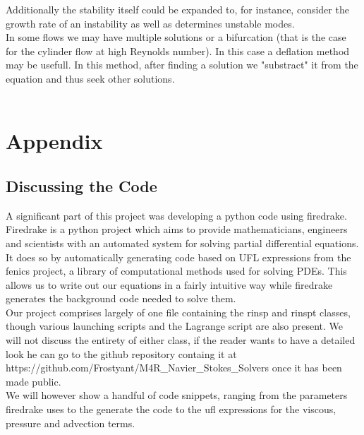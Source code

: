 \documentclass[11pt,twoside,a4paper]{article}
\begin{document}
Additionally the stability itself could be expanded to, for instance, consider the growth rate of an instability as well as determines unstable modes.\\
In some flows we may have multiple solutions or a bifurcation (that is the case for the cylinder flow at high Reynolds number). In this case a deflation method may be usefull. In this method, after finding a solution we "substract" it from the equation and thus seek other solutions.\\
\\


\section{Appendix}
\subsection{Discussing the Code}
A significant part of this project was developing a python code using firedrake.
Firedrake is a python project which aims to provide mathematicians, engineers and scientists with an automated system for solving partial differential equations.\\
It does so by automatically generating code based on UFL expressions from the fenics project, a library of computational methods used for solving PDEs. This allows us to write out our equations in a fairly intuitive way while firedrake generates the background code needed to solve them.\\
Our project comprises largely of one file containing the rinsp and rinspt classes, though various launching scripts and the Lagrange script are also present. We will not discuss the entirety of either class, if the reader wants to have a detailed look he can go to the github repository containg it at https://github.com/Frostyant/M4R\_Navier\_Stokes\_Solvers once it has been made public.\\
We will however show a handful of code snippets, ranging from the parameters firedrake uses to the generate the code to the ufl expressions for the viscous, pressure and advection terms.
\end{document}
